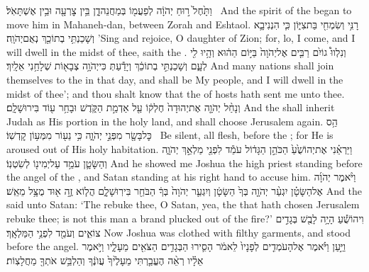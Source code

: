 {וַתָּ֙חֶל֙ ר֣וּחַ יְהֹוָ֔ה לְפַעֲמ֖וֹ בְּמַחֲנֵה\maqqaf דָ֑ן בֵּ֥ין צׇרְעָ֖ה וּבֵ֥ין אֶשְׁתָּאֹֽל׃ \petucha }
{And the spirit of the \lord\space began to move him in Mahaneh-dan, between Zorah and Eshtaol.}
\label{haft_36}
\setcounter{chap}{2}
\setcounter{verse}{14}
{רָנִּ֥י וְשִׂמְחִ֖י בַּת\maqqaf צִיּ֑וֹן כִּ֧י הִנְנִי\maqqaf בָ֛א וְשָׁכַנְתִּ֥י בְתוֹכֵ֖ךְ נְאֻם\maqqaf יְהֹוָֽה׃}
{’Sing and rejoice, O daughter of Zion; for, lo, I come, and I will dwell in the midst of thee, saith the \lord.}
{וְנִלְווּ֩ גוֹיִ֨ם רַבִּ֤ים אֶל\maqqaf יְהֹוָה֙ בַּיּ֣וֹם הַה֔וּא וְהָ֥יוּ לִ֖י לְעָ֑ם וְשָׁכַנְתִּ֣י בְתוֹכֵ֔ךְ וְיָדַ֕עַתְּ כִּי\maqqaf יְהֹוָ֥ה צְבָא֖וֹת שְׁלָחַ֥נִי אֵלָֽיִךְ׃}
{And many nations shall join themselves to the \lord\space in that day, and shall be My people, and I will dwell in the midst of thee’; and thou shalt know that the \lord\space of hosts hath sent me unto thee.}
{וְנָחַ֨ל יְהֹוָ֤ה אֶת\maqqaf יְהוּדָה֙ חֶלְק֔וֹ עַ֖ל אַדְמַ֣ת הַקֹּ֑דֶשׁ וּבָחַ֥ר ע֖וֹד בִּירוּשָׁלָֽ͏ִם׃}
{And the \lord\space shall inherit Judah as His portion in the holy land, and shall choose Jerusalem again.}
{הַ֥ס כׇּל\maqqaf בָּשָׂ֖ר מִפְּנֵ֣י יְהֹוָ֑ה כִּ֥י נֵע֖וֹר מִמְּע֥וֹן קׇדְשֽׁוֹ׃ \petucha }
{Be silent, all flesh, before the \lord; for He is aroused out of His holy habitation.}
\newperek
{}
{וַיַּרְאֵ֗נִי אֶת\maqqaf יְהוֹשֻׁ֙עַ֙ הַכֹּהֵ֣ן הַגָּד֔וֹל עֹמֵ֕ד לִפְנֵ֖י מַלְאַ֣ךְ יְהֹוָ֑ה וְהַשָּׂטָ֛ן עֹמֵ֥ד עַל\maqqaf יְמִינ֖וֹ לְשִׂטְנֽוֹ׃}
{And he showed me Joshua the high priest standing before the angel of the \lord, and Satan standing at his right hand to accuse him.}
{וַיֹּ֨אמֶר יְהֹוָ֜ה אֶל\maqqaf הַשָּׂטָ֗ן יִגְעַ֨ר יְהֹוָ֤ה בְּךָ֙ הַשָּׂטָ֔ן וְיִגְעַ֤ר יְהֹוָה֙ בְּךָ֔ הַבֹּחֵ֖ר בִּירֽוּשָׁלָ֑͏ִם הֲל֧וֹא זֶ֦ה א֖וּד מֻצָּ֥ל מֵאֵֽשׁ׃}
{And the \lord\space said unto Satan: ‘The \lord\space rebuke thee, O Satan, yea, the \lord\space that hath chosen Jerusalem rebuke thee; is not this man a brand plucked out of the fire?’}
{וִיהוֹשֻׁ֕עַ הָיָ֥ה לָבֻ֖שׁ בְּגָדִ֣ים צוֹאִ֑ים וְעֹמֵ֖ד לִפְנֵ֥י הַמַּלְאָֽךְ׃}
{Now Joshua was clothed with filthy garments, and stood before the angel.}
{וַיַּ֣עַן וַיֹּ֗אמֶר אֶל\maqqaf הָעֹמְדִ֤ים לְפָנָיו֙ לֵאמֹ֔ר הָסִ֛ירוּ הַבְּגָדִ֥ים הַצֹּאִ֖ים מֵעָלָ֑יו וַיֹּ֣אמֶר אֵלָ֗יו רְאֵ֨ה הֶעֱבַ֤רְתִּי מֵעָלֶ֙יךָ֙ עֲוֺנֶ֔ךָ וְהַלְבֵּ֥שׁ אֹתְךָ֖ מַחֲלָצֽוֹת׃}
